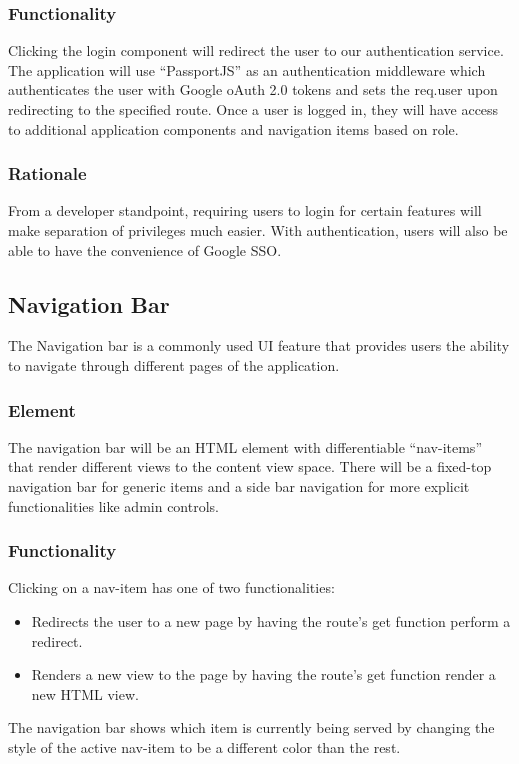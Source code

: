 \documentclass[journal,10pt,onecolumn,compsoc]{IEEEtran}
\begin{document}
	\subsubsection{Functionality}
    Clicking the login component will redirect the user to our authentication service. The application will use ``PassportJS'' as an authentication middleware which authenticates the user with Google oAuth 2.0 tokens and sets the req.user upon redirecting to the specified route. Once a user is logged in, they will have access to additional application components and navigation items based on role.
	\subsubsection{Rationale}
	From a developer standpoint, requiring users to login for certain features will make separation of privileges much easier. With authentication, users will also be able to have the convenience of Google SSO.
	
	\subsection{Navigation Bar}
	The Navigation bar is a commonly used UI feature that provides users the ability to navigate through different pages of the application.
    \subsubsection{Element}
    The navigation bar will be an HTML element with differentiable ``nav-items'' that render different views to the content view space. There will be a fixed-top navigation bar for generic items and a side bar navigation for more explicit functionalities like admin controls. 
    \subsubsection{Functionality}
    Clicking on a nav-item has one of two functionalities: 
    \begin{itemize}
        \item Redirects the user to a new page by having the route's get function perform a redirect.
        \item Renders a new view to the page by having the route's get function render a new HTML view.
    \end{itemize}
	The navigation bar shows which item is currently being served by changing the style of the active nav-item to be a different color than the rest.
\end{document}
